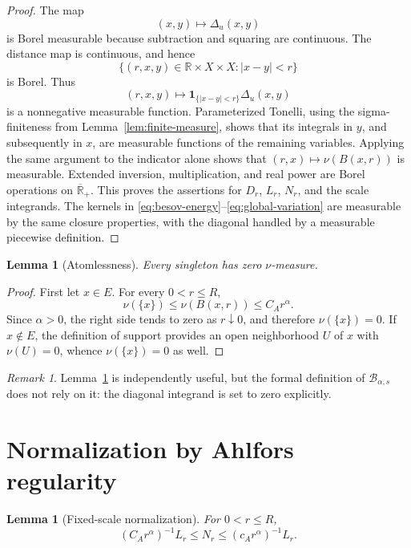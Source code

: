 \documentclass[11pt]{article}
\newtheorem{lemma}[theorem]{Lemma}
\theoremstyle{remark}
\newtheorem{remark}[theorem]{Remark}
\newcommand{\Rbarp}{\overline{\mathbb R}_{+}}
\newcommand{\ind}{\mathbf{1}}
\newcommand{\Benergy}{\mathcal B}
\begin{document}
\begin{proof}
The map
\[
  (x,y)\longmapsto\Delta_u(x,y)
\]
is Borel measurable because subtraction and squaring are continuous.
The distance map is continuous, and hence
\[
  \{(r,x,y)\in\mathbb R\times X\times X:\lvert x-y\rvert<r\}
\]
is Borel.  Thus
\[
  (r,x,y)
  \longmapsto
  \ind_{\{\lvert x-y\rvert<r\}}\Delta_u(x,y)
\]
is a nonnegative measurable function.  Parameterized Tonelli, using the
sigma-finiteness from Lemma~\ref{lem:finite-measure}, shows that its
integrals in \(y\), and subsequently in \(x\), are measurable functions of
the remaining variables.  Applying the same argument to the indicator
alone shows that \((r,x)\mapsto\nu(B(x,r))\) is measurable.  Extended
inversion, multiplication, and real power are Borel operations on
\(\Rbarp\).  This proves the assertions for \(D_r\), \(L_r\), \(N_r\), and
the scale integrands.  The kernels in
\eqref{eq:besov-energy}--\eqref{eq:global-variation} are measurable by the
same closure properties, with the diagonal handled by a measurable
piecewise definition.
\end{proof}

\begin{lemma}[Atomlessness]                                                \label{lem:atomless}
Every singleton has zero \(\nu\)-measure.
\end{lemma}

\begin{proof}
First let \(x\in E\).  For every \(0<r\leq R\),
\[
  \nu(\{x\})
  \leq\nu(B(x,r))
  \leq C_A r^\alpha.
\]
Since \(\alpha>0\), the right side tends to zero as \(r\downarrow0\), and
therefore \(\nu(\{x\})=0\).  If \(x\notin E\), the definition of support
provides an open neighborhood \(U\) of \(x\) with \(\nu(U)=0\), whence
\(\nu(\{x\})=0\) as well.
\end{proof}

\begin{remark}
Lemma~\ref{lem:atomless} is independently useful, but the formal definition
of \(\Benergy_{\alpha,s}\) does not rely on it: the diagonal integrand is
set to zero explicitly.
\end{remark}

\section{Normalization by Ahlfors regularity}

\begin{lemma}[Fixed-scale normalization]                                  \label{lem:fixed-normalization}
For \(0<r\leq R\),
\[
  (C_A r^\alpha)^{-1}L_r
  \leq N_r
  \leq(c_A r^\alpha)^{-1}L_r.
\]
\end{lemma}
\end{document}

